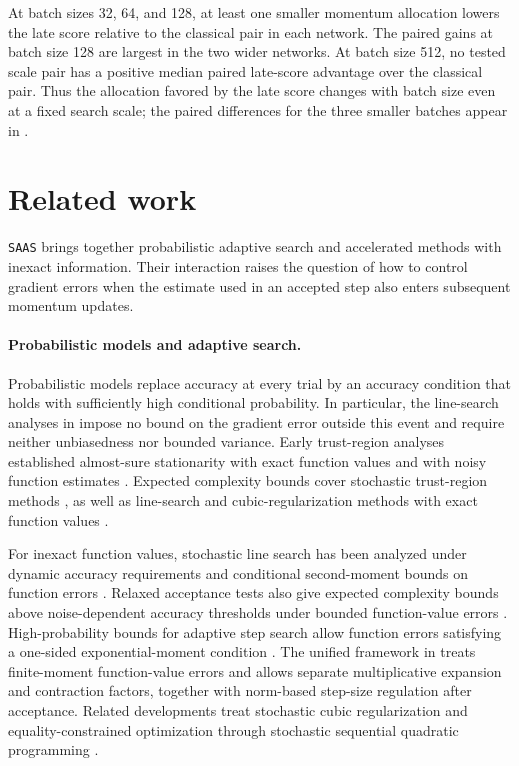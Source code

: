\documentclass{article}
\begin{document}
At batch sizes 32, 64, and 128, at least one smaller momentum
allocation lowers the late score relative to the classical pair in
each network. The paired gains at batch size 128 are largest in the two
wider networks. At batch size 512, no tested scale pair has a positive
median paired late-score advantage over the classical pair. Thus the
allocation favored by the late score changes with
batch size even at a fixed search scale; the paired differences for the
three smaller batches appear in .

\FloatBarrier
\endgroup
\section{Related work}
\texttt{SAAS} brings together probabilistic adaptive search and accelerated methods with inexact information. Their interaction raises the question of how to control gradient errors when the estimate used in an accepted step also enters subsequent momentum updates.

\paragraph{Probabilistic models and adaptive search.}
Probabilistic models replace accuracy at every trial by an accuracy
condition that holds with sufficiently high conditional probability.
In particular, the line-search analyses in \cite{Cartis2018,Albert2021,Xie2024} impose
no bound on the gradient error outside this event and require neither
unbiasedness nor bounded variance. Early trust-region analyses established
almost-sure stationarity with exact function values \cite{Bandeira2014probabilistic} and with
noisy function estimates \cite{Chen2018trust}. Expected complexity bounds cover stochastic trust-region methods
\cite{blanchet2019convergence}, as well as line-search and cubic-regularization methods
with exact function values \cite{Cartis2018}.

For inexact function values, stochastic line search has been analyzed
under dynamic accuracy requirements and conditional second-moment
bounds on function errors \cite{courtny}. Relaxed acceptance tests also give
expected complexity bounds above noise-dependent accuracy thresholds
under bounded function-value errors \cite{Albert2021}. High-probability bounds
for adaptive step search allow function errors satisfying a one-sided
exponential-moment condition \cite{Xie2024}. The unified framework in \cite{scheinberg2025stochasticadaptiveoptimizationunreliable}
treats finite-moment function-value errors and allows separate
multiplicative expansion and contraction factors, together with
norm-based step-size regulation after acceptance. Related developments
treat stochastic cubic regularization \cite{scheinberg2023cubic} and equality-constrained
optimization through stochastic sequential quadratic programming \cite{SQP-XIE}.
\end{document}

